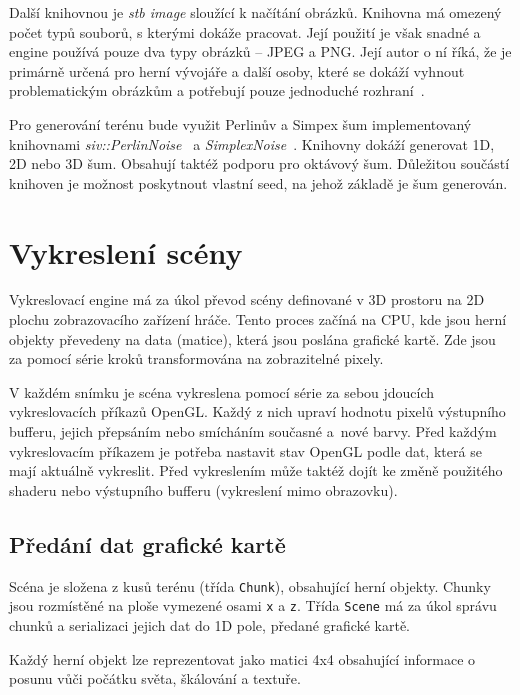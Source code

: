 \documentclass[thesis=M,czech]{FITthesis}[2019/12/23]
\begin{document}
Další knihovnou je \textit{stb image} sloužící k načítání obrázků. Knihovna má omezený počet typů souborů, s kterými dokáže pracovat. Její použití je však snadné a engine používá pouze dva typy obrázků – JPEG a PNG. Její autor o ní říká, že je primárně určená pro herní vývojáře a další osoby, které se dokáží vyhnout problematickým obrázkům a potřebují pouze jednoduché rozhraní~\cite{stb_image}.

Pro generování terénu bude využit Perlinův a Simpex šum implementovaný knihovnami  \textit{siv::PerlinNoise}~\cite{perlin} a \textit{SimplexNoise}~\cite{simplex_lib}. Knihovny dokáží generovat 1D, 2D nebo 3D šum. Obsahují taktéž podporu pro oktávový šum. Důležitou součástí knihoven je možnost poskytnout vlastní seed, na jehož základě je šum generován.


\chapter{Vykreslení scény}

Vykreslovací engine má za úkol převod scény definované v 3D prostoru na 2D plochu zobrazovacího zařízení hráče. Tento proces začíná na CPU, kde jsou herní objekty převedeny na data (matice), která jsou poslána grafické kartě. Zde jsou za pomocí série kroků transformována na zobrazitelné pixely.

V každém snímku je scéna vykreslena pomocí série za sebou jdoucích vykreslovacích příkazů OpenGL. Každý z nich upraví hodnotu pixelů výstupního bufferu, jejich přepsáním nebo smícháním současné a~nové barvy. Před každým vykreslovacím příkazem je potřeba nastavit stav OpenGL podle dat, která se mají aktuálně vykreslit. Před vykreslením může taktéž dojít ke změně použitého shaderu nebo výstupního bufferu (vykreslení mimo obrazovku).

\section{Předání dat grafické kartě}

Scéna je složena z kusů terénu (třída \texttt{Chunk}), obsahující herní objekty. Chunky jsou rozmístěné na ploše vymezené osami \texttt{x} a \texttt{z}. Třída \texttt{Scene} má za úkol správu chunků a serializaci jejich dat do 1D pole, předané grafické kartě.

Každý herní objekt lze reprezentovat jako matici 4x4 obsahující informace o posunu vůči počátku světa, škálování a textuře.
\end{document}
